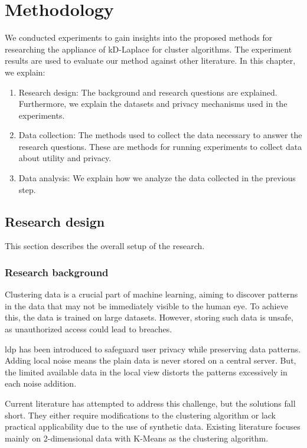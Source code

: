 \chapter{Methodology}

We conducted experiments to gain insights into the proposed methods for researching the appliance of kD-Laplace for cluster algorithms.
The experiment results are used to evaluate our method against other literature.
In this chapter, we explain:
\begin{enumerate}
  \item Research design: The background and research questions are explained.
        Furthermore, we explain the datasets and privacy mechanisms used in the experiments.
  \item Data collection: The methods used to collect the data necessary to answer the research questions.
        These are methods for running experiments to collect data about utility and privacy.
  \item Data analysis: We explain how we analyze the data collected in the previous step.
\end{enumerate}

\section{Research design}
This section describes the overall setup of the research.
\subsection{Research background}
Clustering data is a crucial part of machine learning, aiming to discover patterns in the data that may not be immediately visible to the human eye.
To achieve this, the data is trained on large datasets.
However, storing such data is unsafe, as unauthorized access could lead to breaches.

\gls{ldp} has been introduced to safeguard user privacy while preserving data patterns.
Adding local noise means the plain data is never stored on a central server.
But, the limited available data in the local view distorts the patterns excessively in each noise addition.

Current literature has attempted to address this challenge, but the solutions fall short.
They either require modifications to the clustering algorithm or lack practical applicability due to the use of synthetic data.
Existing literature focuses mainly on 2-dimensional data with K-Means as the clustering algorithm.

